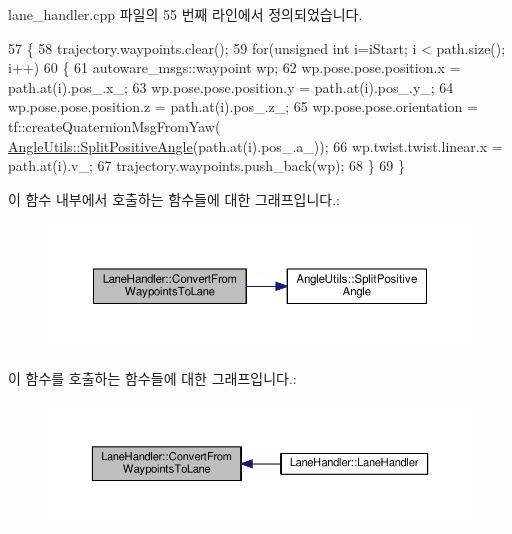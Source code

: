 lane\+\_\+handler.\+cpp 파일의 55 번째 라인에서 정의되었습니다.


\begin{DoxyCode}
57 \{
58   trajectory.waypoints.clear();
59   \textcolor{keywordflow}{for}(\textcolor{keywordtype}{unsigned} \textcolor{keywordtype}{int} i=iStart; i < path.size(); i++)
60   \{
61     autoware\_msgs::waypoint wp;
62     wp.pose.pose.position.x = path.at(i).pos\_.x\_;
63     wp.pose.pose.position.y = path.at(i).pos\_.y\_;
64     wp.pose.pose.position.z = path.at(i).pos\_.z\_;
65     wp.pose.pose.orientation = tf::createQuaternionMsgFromYaw(
      \hyperlink{class_angle_utils_a91f3e34c9e1e35788d44a2f6bc5bc206}{AngleUtils::SplitPositiveAngle}(path.at(i).pos\_.a\_));
66     wp.twist.twist.linear.x = path.at(i).v\_;
67     trajectory.waypoints.push\_back(wp);
68   \}
69 \}
\end{DoxyCode}


이 함수 내부에서 호출하는 함수들에 대한 그래프입니다.\+:\nopagebreak
\begin{figure}[H]
\begin{center}
\leavevmode
\includegraphics[width=350pt]{class_lane_handler_a70a120b84428226b70754055b42dca2f_cgraph}
\end{center}
\end{figure}




이 함수를 호출하는 함수들에 대한 그래프입니다.\+:\nopagebreak
\begin{figure}[H]
\begin{center}
\leavevmode
\includegraphics[width=350pt]{class_lane_handler_a70a120b84428226b70754055b42dca2f_icgraph}
\end{center}
\end{figure}



